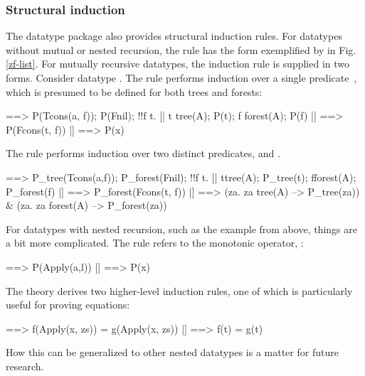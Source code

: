 \subsubsection{Structural induction}

The datatype package also provides structural induction rules.  For datatypes
without mutual or nested recursion, the rule has the form exemplified by
 in Fig.\ts\ref{zf-list}.  For mutually recursive
datatypes, the induction rule is supplied in two forms.  Consider datatype
.  The rule  performs induction over a
single predicate~, which is presumed to be defined for both trees
and forests:
\begin{alltt*}\isastyleminor
[| x \isasymin tree_forest(A);
   !!a f. [| a \isasymin A; f \isasymin forest(A); P(f) |] ==> P(Tcons(a, f)); 
   P(Fnil);
   !!f t. [| t \isasymin tree(A); P(t); f \isasymin forest(A); P(f) |]
          ==> P(Fcons(t, f)) 
|] ==> P(x)
\end{alltt*}
The rule  performs induction over two
distinct predicates,  and .
\begin{alltt*}\isastyleminor
[| !!a f.
      [| a{\isasymin}A; f{\isasymin}forest(A); P_forest(f) |] ==> P_tree(Tcons(a,f));
   P_forest(Fnil);
   !!f t. [| t{\isasymin}tree(A); P_tree(t); f{\isasymin}forest(A); P_forest(f) |]
          ==> P_forest(Fcons(t, f)) 
|] ==> ({\isasymforall}za. za \isasymin tree(A) --> P_tree(za)) &
    ({\isasymforall}za. za \isasymin forest(A) --> P_forest(za))
\end{alltt*}

For datatypes with nested recursion, such as the  example from
above, things are a bit more complicated.  The rule 
refers to the monotonic operator, :
\begin{alltt*}\isastyleminor
[| x \isasymin term(A);
   !!a l. [| a\isasymin{}A; l\isasymin{}list(Collect(term(A), P)) |] ==> P(Apply(a,l)) 
|] ==> P(x)
\end{alltt*}
The theory  derives two higher-level induction rules,
one of which is particularly useful for proving equations:
\begin{alltt*}\isastyleminor
[| t \isasymin term(A);
   !!x zs. [| x \isasymin A; zs \isasymin list(term(A)); map(f, zs) = map(g, zs) |]
           ==> f(Apply(x, zs)) = g(Apply(x, zs)) 
|] ==> f(t) = g(t)  
\end{alltt*}
How this can be generalized to other nested datatypes is a matter for future
research.


